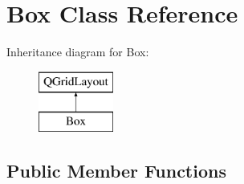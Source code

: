 \hypertarget{class_box}{}\section{Box Class Reference}
\label{class_box}
Inheritance diagram for Box\+:\begin{figure}[H]
\begin{center}
\leavevmode
\includegraphics[height=2.000000cm]{class_box}
\end{center}
\end{figure}
\subsection*{Public Member Functions}

